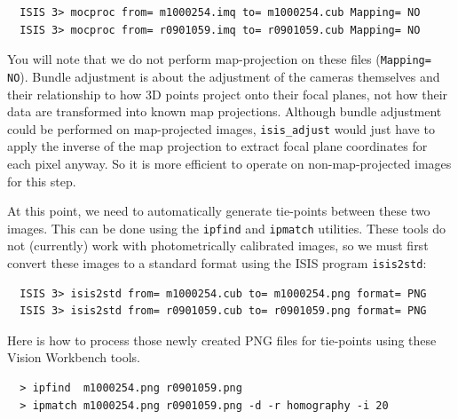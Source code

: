 \begin{verbatim}
  ISIS 3> mocproc from= m1000254.imq to= m1000254.cub Mapping= NO
  ISIS 3> mocproc from= r0901059.imq to= r0901059.cub Mapping= NO
\end{verbatim}

You will note that we do not perform map-projection on these files
(\texttt{Mapping= NO}).  Bundle adjustment is about the adjustment
of the cameras themselves and their relationship to how 3D points
project onto their focal planes, not how their data are transformed
into known map projections.  Although bundle adjustment could be 
performed on map-projected images, \texttt{isis\_adjust} would just
have to apply the inverse of the map projection to extract focal plane
coordinates for each pixel anyway.  So it is more efficient to operate
on non-map-projected images for this step.

At this point, we need to automatically generate tie-points between
these two images.  This can be done using the \texttt{ipfind} and
\texttt{ipmatch} utilities.  These tools do not (currently) work
with photometrically calibrated images, so we must first convert
these images to a standard format using the \ac{ISIS} program
\texttt{isis2std}:

\begin{verbatim}
  ISIS 3> isis2std from= m1000254.cub to= m1000254.png format= PNG
  ISIS 3> isis2std from= r0901059.cub to= r0901059.png format= PNG
\end{verbatim}

Here is how to process those newly created PNG files for tie-points
using these Vision Workbench tools.

\begin{verbatim}
  > ipfind  m1000254.png r0901059.png
  > ipmatch m1000254.png r0901059.png -d -r homography -i 20
\end{verbatim}

\begin{center}
\end{center}

